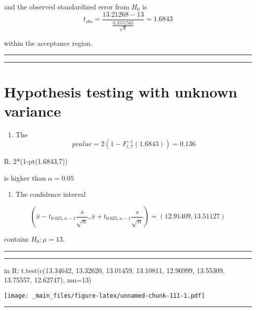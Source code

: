 \documentclass[
]{book}
\providecommand{\tightlist}{%
  \setlength{\itemsep}{0pt}\setlength{\parskip}{0pt}}
\begin{document}
and the observed standardized error from \(H_0\) is
\[t_{obs} =  \frac{13.21268-13}{\frac{0.3571565}{\sqrt{8}}}=1.6843\]

within the acceptance region.

\begin{center}\rule{0.5\linewidth}{0.5pt}\end{center}

\begin{center}\rule{0.5\linewidth}{0.5pt}\end{center}

\hypertarget{hypothesis-testing-with-unknown-variance-1}{%
\section{Hypothesis testing with unknown variance}\label{hypothesis-testing-with-unknown-variance-1}}

\begin{enumerate}
\def\labelenumi{\arabic{enumi}.}
\setcounter{enumi}{1}
\tightlist
\item
  The \[pvalue=2(1-F^{-1}_{t,7}(1.6843))=0.136\]
\end{enumerate}

R: 2*(1-pt(1.6843,7))

is higher than \(\alpha=0.05\)

\begin{enumerate}
\def\labelenumi{\arabic{enumi}.}
\setcounter{enumi}{2}
\tightlist
\item
  The confidence interval
\end{enumerate}

\[(\bar{x}-t_{0.025, n-1} \frac{s}{\sqrt{n}}, \bar{x}+t_{0.025, n-1} \frac{s}{\sqrt{n}})=(12.91409, 13.51127)\]

contains \(H_0:\mu=13\).

\begin{center}\rule{0.5\linewidth}{0.5pt}\end{center}

\begin{center}\rule{0.5\linewidth}{0.5pt}\end{center}

in R:
t.test(c(13.34642, 13.32620, 13.01459, 13.10811,
12.96999, 13.55309, 13.75557, 12.62747), mu=13)

\texttt{[image: \_main\_files/figure-latex/unnamed-chunk-111-1.pdf]}

\begin{center}\rule{0.5\linewidth}{0.5pt}\end{center}
\end{document}
